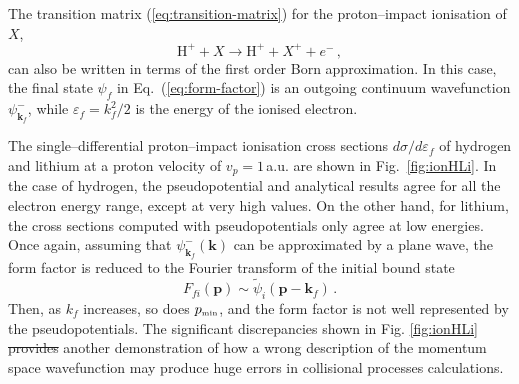\documentclass[10pt]{article}
\providecommand{\DIFaddtex}[1]{{\protect\color{blue}\uwave{#1}}} %
\providecommand{\DIFdeltex}[1]{{\protect\color{red}\sout{#1}}}                      %
\providecommand{\DIFaddbegin}{} %
\providecommand{\DIFaddend}{} %
\providecommand{\DIFdelbegin}{} %
\providecommand{\DIFdelend}{} %
\providecommand{\DIFadd}[1]{\texorpdfstring{\DIFaddtex{#1}}{#1}} %
\providecommand{\DIFdel}[1]{\texorpdfstring{\DIFdeltex{#1}}{}} %
\begin{document}
The transition matrix (\ref{eq:transition-matrix}) for the 
proton--impact ionisation of $X$,
\begin{equation}
 \mbox{H}^+ + X \rightarrow \mbox{H}^+ + X^+ + e^-\,,
\end{equation}
can also be written in terms of the first order Born approximation. 
In this case, the final state $\psi_{\!f}$ in 
Eq.~(\ref{eq:form-factor}) is an outgoing continuum wavefunction 
$\psi_{\mathbf{k}_{\!f}}^-$, while $\varepsilon_{\!f}=k_{\!f}^2/2$ is 
the energy of the ionised electron. 

The single--differential proton--impact ionisation cross sections 
$d\sigma/d\varepsilon_{\!f}$ of hydrogen and lithium at a proton 
velocity of $v_p=1$\,a.u. are shown in Fig.~\ref{fig:ionHLi}. In the 
case of hydrogen, the pseudopotential and analytical results agree 
for all the electron energy range, except at very high values. On the 
other hand, for lithium, the cross sections computed with 
pseudopotentials only agree at low energies. Once again, assuming 
that $\psi_{\mathbf{k}_{\!f}}^-(\mathbf{k})$ can be approximated by a 
plane wave, the form factor is reduced to the Fourier transform of 
the initial bound state
\begin{equation}
 F_{\!fi}(\mathbf{p})\sim\widetilde{\psi}_i(\mathbf{p}-\mathbf{k}_{\!f})\,.
\end{equation}
Then, as $k_{\!f}$ increases, so does $p_{\mbox{\tiny min}}$, and the 
form factor is not well represented by the pseudopotentials. The 
significant discrepancies shown in Fig. \ref{fig:ionHLi} \DIFdelbegin \DIFdel{provides }\DIFdelend \DIFaddbegin \DIFadd{provide 
}\DIFaddend another demonstration of how a wrong description of the momentum 
space wavefunction may produce huge errors in collisional processes 
calculations.
\end{document}
